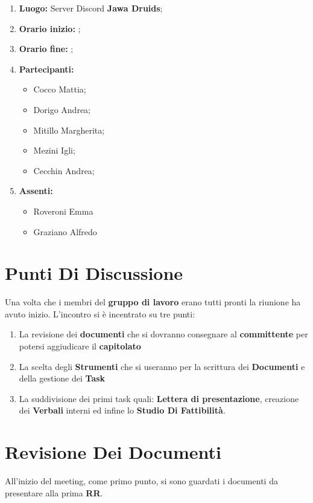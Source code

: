 \documentclass[a4paper,12pt]{report}
\begin{document}
	\makeatother	
	\newpage
	\begin{enumerate}
		\item \textbf{Luogo:} \normalfont Server Discord \textbf{Jawa Druids};
		\item \textbf{Orario inizio:} ;
		\item \textbf{Orario fine:} ;
		\item \textbf{Partecipanti:}
		\begin{itemize}
			\item Cocco Mattia;
			\item Dorigo Andrea;
			\item Mitillo Margherita;
			\item Mezini Igli;
			\item Cecchin Andrea;
		\end{itemize}
		\item \textbf{Assenti:}
		\begin{itemize}
			\item Roveroni Emma
			\item Graziano Alfredo
		\end{itemize}
	\end{enumerate}
	\newpage
	\tableofcontents{}
	\chapter{Punti Di Discussione}
	Una volta che i membri del \textbf{gruppo di lavoro} erano tutti pronti la riunione ha avuto inizio.
	L'incontro si è incentrato su tre punti:
	\begin{enumerate}
		\item La revisione dei \textbf{documenti} che si dovranno consegnare al \textbf{committente} per potersi aggiudicare il \textbf{capitolato}
		
		\item La scelta degli \textbf{Strumenti} che si useranno per la scrittura dei \textbf{Documenti} e della gestione dei \textbf{Task}
		
		\item La suddivisione dei primi task quali: \textbf{Lettera di presentazione}, creazione dei \textbf{Verbali} interni ed infine lo \textbf{Studio Di Fattibilità}.
	\end{enumerate}
	\chapter{Revisione Dei Documenti}
	All'inizio del meeting, come primo punto, si sono guardati i documenti da presentare alla prima \textbf{RR}.
	
\end{document}
